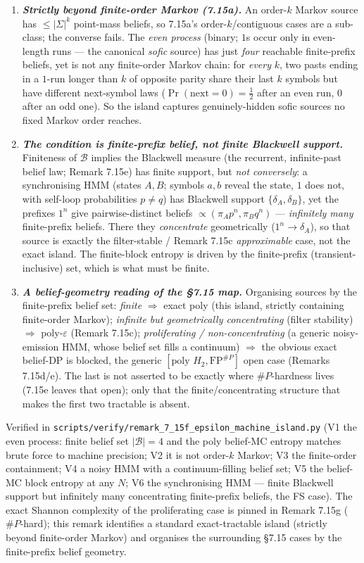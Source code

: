 \documentclass[
]{article}
\begin{document}
\begin{enumerate}
\item \emph{\textbf{Strictly beyond finite-order Markov (7.15a).}} An order-$k$ Markov
source has $\le|\Sigma|^k$ point-mass beliefs, so 7.15a's order-$k$/contiguous cases are
a sub-class; the converse fails. The \emph{even process} (binary; $1$s occur only in
even-length runs --- the canonical \emph{sofic} source) has just \emph{four} reachable
finite-prefix beliefs, yet is not any finite-order Markov chain: for \emph{every} $k$,
two pasts ending in a $1$-run longer than $k$ of opposite parity share their last $k$
symbols but have different next-symbol laws ($\Pr(\text{next}=0)=\tfrac12$ after an even
run, $0$ after an odd one). So the island captures genuinely-hidden sofic sources no
fixed Markov order reaches.
\item \emph{\textbf{The condition is finite-prefix belief, \emph{not} finite Blackwell
support.}} Finiteness of $\mathcal B$ implies the Blackwell measure (the recurrent,
infinite-past belief law; Remark 7.15e) has finite support, but \emph{not conversely}:
a synchronising HMM (states $A,B$; symbols $a,b$ reveal the state, $1$ does not, with
self-loop probabilities $p\neq q$) has Blackwell support $\{\delta_A,\delta_B\}$, yet the
prefixes $1^n$ give pairwise-distinct beliefs $\propto(\pi_A p^n,\pi_B q^n)$ ---
\emph{infinitely many} finite-prefix beliefs. There they \emph{concentrate}
geometrically ($1^n\!\to\delta_A$), so that source is exactly the filter-stable /
Remark 7.15c \emph{approximable} case, not the exact island. The finite-block entropy is
driven by the finite-prefix (transient-inclusive) set, which is what must be finite.
\item \emph{\textbf{A belief-geometry reading of the §7.15 map.}} Organising sources by
the finite-prefix belief set: \emph{finite} $\Rightarrow$ exact poly (this island,
strictly containing finite-order Markov); \emph{infinite but geometrically concentrating}
(filter stability) $\Rightarrow$ poly-$\varepsilon$ (Remark 7.15c); \emph{proliferating
/ non-concentrating} (a generic noisy-emission HMM, whose belief set fills a continuum)
$\Rightarrow$ the obvious exact belief-DP is blocked, the generic $[\text{poly }H_2,
\mathrm{FP}^{\#P}]$ open case (Remarks 7.15d/e). The last is not asserted to be exactly
where $\#P$-hardness lives (7.15e leaves that open); only that the finite/concentrating
structure that makes the first two tractable is absent.
\end{enumerate}
Verified in \texttt{scripts/verify/remark\_7\_15f\_epsilon\_machine\_island.py} (V1 the
even process: finite belief set $|\mathcal B|{=}4$ and the poly belief-MC entropy matches
brute force to machine precision; V2 it is not order-$k$ Markov; V3 the finite-order
containment; V4 a noisy HMM with a continuum-filling belief set; V5 the belief-MC block
entropy at any $N$; V6 the synchronising HMM --- finite Blackwell support but infinitely
many concentrating finite-prefix beliefs, the FS case). The exact Shannon complexity of
the proliferating case is pinned in Remark 7.15g ($\#P$-hard); this remark identifies a standard exact-tractable
island (strictly beyond finite-order Markov) and organises the surrounding §7.15 cases by
the finite-prefix belief geometry.
\end{document}
